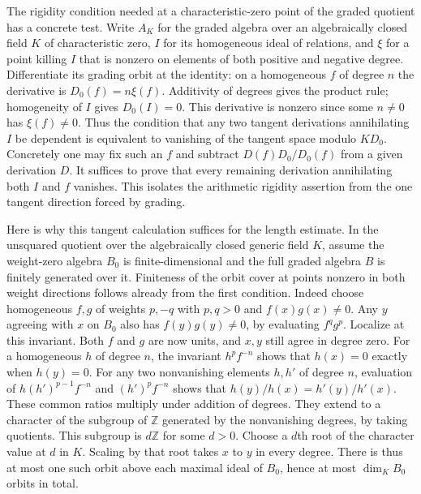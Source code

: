 \documentclass[11pt]{amsart}
\theoremstyle{definition}
\theoremstyle{remark}
\begin{document}
The rigidity condition needed at a characteristic-zero point of the
graded quotient has a concrete test. Write $A_K$ for the graded
algebra over an algebraically closed field $K$ of characteristic
zero, $I$ for its homogeneous ideal of relations, and $\xi$ for a
point killing $I$ that is nonzero on elements of both positive and
negative degree. Differentiate its grading orbit at the identity:
on a homogeneous $f$ of degree $n$ the derivative is
$D_0(f)=n\xi(f)$. Additivity of degrees gives the product rule;
homogeneity of $I$ gives $D_0(I)=0$. This derivative is nonzero
since some $n\ne0$ has $\xi(f)\ne0$. Thus the condition that any
two tangent derivations annihilating $I$ be dependent is equivalent
to vanishing of the tangent space modulo $K D_0$. Concretely one
may fix such an $f$ and subtract $D(f)D_0/D_0(f)$ from a given
derivation $D$. It suffices to prove that every remaining derivation
annihilating both $I$ and $f$ vanishes. This isolates the arithmetic
rigidity assertion from the one tangent direction forced by grading.

Here is why this tangent calculation suffices for the length estimate.
In the unsquared quotient over the algebraically closed generic
field $K$, assume the weight-zero algebra $B_0$ is finite-dimensional
and the full graded algebra $B$ is finitely generated over it.
Finiteness of the orbit cover at points nonzero in both weight
directions follows already from the first condition. Indeed choose
homogeneous $f,g$ of weights $p,-q$ with $p,q>0$ and $f(x)g(x)\ne0$.
Any $y$ agreeing with $x$ on $B_0$ also has $f(y)g(y)\ne0$,
by evaluating $f^qg^p$. Localize at this invariant. Both $f$ and
$g$ are now units, and $x,y$ still agree in degree zero.
For a homogeneous $h$ of degree $n$, the invariant $h^p f^{-n}$
shows that $h(x)=0$ exactly when $h(y)=0$. For any two nonvanishing
elements $h,h'$ of degree $n$, evaluation of
$h(h')^{p-1}f^{-n}$ and $(h')^pf^{-n}$ shows that
$h(y)/h(x)=h'(y)/h'(x)$. These common ratios multiply under
addition of degrees. They extend to a character of the subgroup
of $\mathbb Z$ generated by the nonvanishing degrees, by taking
quotients. This subgroup is $d\mathbb Z$ for some $d>0$.
Choose a $d$th root of the character value at $d$ in $K$.
Scaling by that root takes $x$ to $y$ in every degree.
There is thus at most one such orbit above each maximal ideal
of $B_0$, hence at most $\dim_K B_0$ orbits in total.
\end{document}
